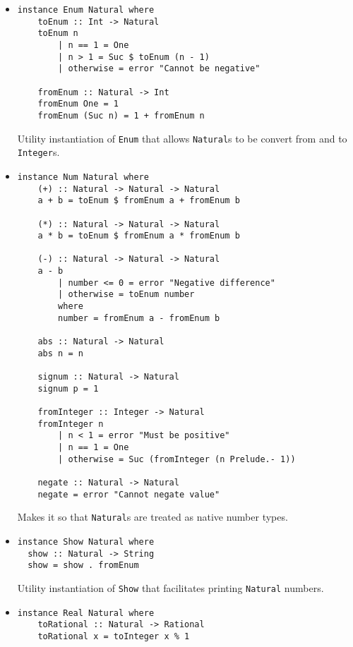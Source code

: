 \documentclass[11pt,a4paper]{article}
\begin{document}
\begin{itemize}
    \item \begin{lstlisting}
instance Enum Natural where
    toEnum :: Int -> Natural
    toEnum n
        | n == 1 = One
        | n > 1 = Suc $ toEnum (n - 1)
        | otherwise = error "Cannot be negative"
    
    fromEnum :: Natural -> Int
    fromEnum One = 1
    fromEnum (Suc n) = 1 + fromEnum n
    \end{lstlisting}

    Utility instantiation of \lstinline{Enum} that allows \lstinline{Natural}s to be convert from and to \lstinline{Integer}s.

    \item \begin{lstlisting}
instance Num Natural where
    (+) :: Natural -> Natural -> Natural
    a + b = toEnum $ fromEnum a + fromEnum b
    
    (*) :: Natural -> Natural -> Natural
    a * b = toEnum $ fromEnum a * fromEnum b
    
    (-) :: Natural -> Natural -> Natural
    a - b
        | number <= 0 = error "Negative difference"
        | otherwise = toEnum number
        where
        number = fromEnum a - fromEnum b
    
    abs :: Natural -> Natural
    abs n = n
    
    signum :: Natural -> Natural
    signum p = 1
    
    fromInteger :: Integer -> Natural
    fromInteger n
        | n < 1 = error "Must be positive"
        | n == 1 = One
        | otherwise = Suc (fromInteger (n Prelude.- 1))
    
    negate :: Natural -> Natural
    negate = error "Cannot negate value"
    \end{lstlisting}

    Makes it so that \lstinline{Natural}s are treated as native number types.

    \item \begin{lstlisting}
instance Show Natural where
  show :: Natural -> String
  show = show . fromEnum
    \end{lstlisting}

    Utility instantiation of \lstinline{Show} that facilitates printing \lstinline{Natural} numbers.

    \item \begin{lstlisting}
instance Real Natural where
    toRational :: Natural -> Rational
    toRational x = toInteger x % 1
    \end{lstlisting}


\end{itemize}
\end{document}
